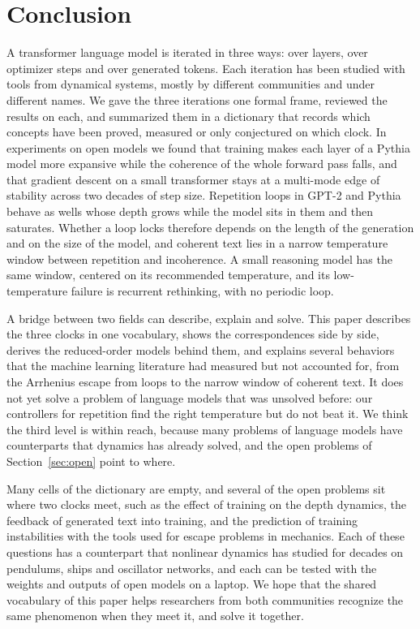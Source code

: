 \section{Conclusion}
\label{sec:conclusion}

A transformer language model is iterated in three ways: over layers, over optimizer steps and over generated tokens. Each iteration has been studied with tools from dynamical systems, mostly by different communities and under different names. We gave the three iterations one formal frame, reviewed the results on each, and summarized them in a dictionary that records which concepts have been proved, measured or only conjectured on which clock. In experiments on open models we found that training makes each layer of a Pythia model more expansive while the coherence of the whole forward pass falls, and that gradient descent on a small transformer stays at a multi-mode edge of stability across two decades of step size. Repetition loops in GPT-2 and Pythia behave as wells whose depth grows while the model sits in them and then saturates. Whether a loop locks therefore depends on the length of the generation and on the size of the model, and coherent text lies in a narrow temperature window between repetition and incoherence. A small reasoning model has the same window, centered on its recommended temperature, and its low-temperature failure is recurrent rethinking, with no periodic loop.

A bridge between two fields can describe, explain and solve. This paper describes the three clocks in one vocabulary, shows the correspondences side by side, derives the reduced-order models behind them, and explains several behaviors that the machine learning literature had measured but not accounted for, from the Arrhenius escape from loops to the narrow window of coherent text. It does not yet solve a problem of language models that was unsolved before: our controllers for repetition find the right temperature but do not beat it. We think the third level is within reach, because many problems of language models have counterparts that dynamics has already solved, and the open problems of Section~\ref{sec:open} point to where.

Many cells of the dictionary are empty, and several of the open problems sit where two clocks meet, such as the effect of training on the depth dynamics, the feedback of generated text into training, and the prediction of training instabilities with the tools used for escape problems in mechanics. Each of these questions has a counterpart that nonlinear dynamics has studied for decades on pendulums, ships and oscillator networks, and each can be tested with the weights and outputs of open models on a laptop. We hope that the shared vocabulary of this paper helps researchers from both communities recognize the same phenomenon when they meet it, and solve it together.

